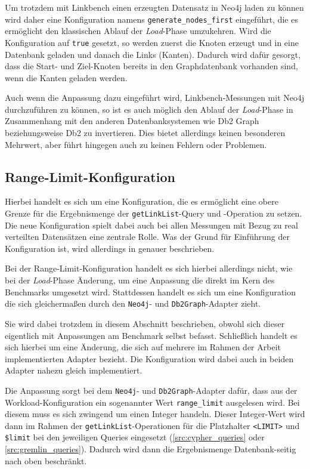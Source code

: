 Um trotzdem mit Linkbench einen erzeugten Datensatz in Neo4j laden zu können wird daher eine Konfiguration namens \texttt{generate\_nodes\_first} eingeführt, die es ermöglicht den klassischen Ablauf der \textit{Load}-Phase umzukehren. Wird die Konfiguration auf \texttt{true} gesetzt, so werden zuerst die Knoten erzeugt und in eine Datenbank geladen und danach die Links (Kanten). Dadurch wird dafür gesorgt, dass die Start- und Ziel-Knoten bereits in den Graphdatenbank vorhanden sind, wenn die Kanten geladen werden. 

Auch wenn die Anpassung dazu eingeführt wird, Linkbench-Messungen mit Neo4j durchzuführen zu können, so ist es auch möglich den Ablauf der \textit{Load}-Phase in Zusammenhang mit den anderen Datenbanksystemen wie Db2 Graph beziehungsweise Db2 zu invertieren. Dies bietet allerdings keinen besonderen Mehrwert, aber führt hingegen auch zu keinen Fehlern oder Problemen.  

\subsection{Range-Limit-Konfiguration}
\label{implementierung:anpassung:limit}
Hierbei handelt es sich um eine Konfiguration, die es ermöglicht eine obere Grenze für die Ergebnismenge der \texttt{getLinkList}-Query und -Operation zu setzen. Die neue Konfiguration spielt dabei auch bei allen Messungen mit Bezug zu real verteilten Datensätzen eine zentrale Rolle. Was der Grund für Einführung der Konfiguration ist, wird allerdings in  genauer beschrieben. 

Bei der Range-Limit-Konfiguration handelt es sich hierbei allerdings nicht, wie bei der \textit{Load}-Phase Änderung, um eine Anpassung die direkt im Kern des Benchmarks umgesetzt wird. Stattdessen handelt es sich um eine Konfiguration die sich gleichermaßen durch den \texttt{Neo4j}- und \texttt{Db2Graph}-Adapter zieht. 

Sie wird dabei trotzdem in diesem Abschnitt beschrieben, obwohl sich dieser eigentlich mit Anpassungen am Benchmark selbst befasst. Schließlich handelt es sich hierbei um eine Änderung, die sich auf mehrere im Rahmen der Arbeit implementierten Adapter bezieht. Die Konfiguration wird dabei auch in beiden Adapter nahezu gleich implementiert. 

Die Anpassung sorgt bei dem \texttt{Neo4j}- und \texttt{Db2Graph}-Adapter dafür, dass aus der Workload-Konfiguration ein sogenannter Wert \texttt{range\_limit} ausgelesen wird. Bei diesem muss es sich zwingend um einen Integer handeln. Dieser Integer-Wert wird dann im Rahmen der \texttt{getLinkList}-Operationen für die Platzhalter \texttt{<LIMIT>} und \texttt{\$limit} bei den jeweiligen Queries eingesetzt (\autoref{src:cypher_queries} oder \autoref{src:gremlin_queries}). Dadurch wird dann die Ergebnismenge Datenbank-seitig nach oben beschränkt. 

